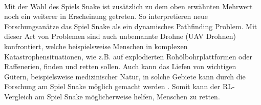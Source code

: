 \\Mit der Wahl des Spiels Snake ist zusätzlich zu dem oben erwähnten Mehrwert noch ein weiterer in Erscheinung getreten. So interpretieren neue Forschungsanätze das Spiel Snake als ein dynamisches Pathfinding Problem. Mit dieser Art von Problemen sind auch unbemannte Drohne (UAV Drohnen) konfrontiert, welche beispielsweise Menschen in komplexen Katastrophensituationen, wie z.B. auf explodierten Rohölbohrplattformen oder Raffenerien, finden und retten sollen. Auch kann das Liefen von wichtigen Gütern, beispielsweise medizinischer Natur, in solche Gebiete kann durch die Forschung am Spiel Snake möglich gemacht werden \cite{UAV}.
Somit kann der RL-Vergleich am Spiel Snake möglicherweise helfen, Menschen zu retten.

